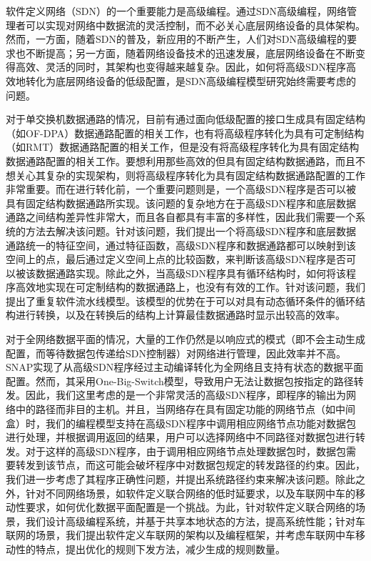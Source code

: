 \begin{cabstract}  

软件定义网络（SDN）的一个重要能力是高级编程。通过SDN高级编程，网络管理者可以实现对网络中数据流的灵活控制，而不必关心底层网络设备的具体架构。然而，一方面，随着SDN的普及，新应用的不断产生，人们对SDN高级编程的要求也不断提高；另一方面，随着网络设备技术的迅速发展，底层网络设备在不断变得高效、灵活的同时，其架构也变得越来越复杂。因此，如何将高级SDN程序高效地转化为底层网络设备的低级配置，是SDN高级编程模型研究始终需要考虑的问题。

对于单交换机数据通路的情况，目前有通过面向低级配置的接口生成具有固定结构（如OF-DPA）数据通路配置的相关工作，也有将高级程序转化为具有可定制结构（如RMT）数据通路配置的相关工作，但是没有将高级程序转化为具有固定结构数据通路配置的相关工作。要想利用那些高效的但具有固定结构数据通路，而且不想关心其复杂的实现架构，则将高级程序转化为具有固定结构数据通路配置的工作非常重要。而在进行转化前，一个重要问题则是，一个高级SDN程序是否可以被具有固定结构数据通路所实现。该问题的复杂地方在于高级SDN程序和底层数据通路之间结构差异性非常大，而且各自都具有丰富的多样性，因此我们需要一个系统的方法去解决该问题。针对该问题，我们提出一个将高级SDN程序和底层数据通路统一的特征空间，通过特征函数，高级SDN程序和数据通路都可以映射到该空间上的点，最后通过定义空间上点的比较函数，来判断该高级SDN程序是否可以被该数据通路实现。除此之外，当高级SDN程序具有循环结构时，如何将该程序高效地实现在可定制结构的数据通路上，也没有有效的工作。针对该问题，我们提出了重复软件流水线模型。该模型的优势在于可以对具有动态循环条件的循环结构进行转换，以及在转换后的结构上计算最佳数据通路时显示出较高的效率。

对于全网络数据平面的情况，大量的工作仍然是以响应式的模式（即不会主动生成配置，而等待数据包传递给SDN控制器）对网络进行管理，因此效率并不高。SNAP实现了从高级SDN程序经过主动编译转化为全网络且支持有状态的数据平面配置。然而，其采用One-Big-Switch模型，导致用户无法让数据包按指定的路径转发。因此，我们这里考虑的是一个非常灵活的高级SDN程序，即程序的输出为网络中的路径而非目的主机。并且，当网络存在具有固定功能的网络节点（如中间盒）时，我们的编程模型支持在高级SDN程序中调用相应网络节点功能对数据包进行处理，并根据调用返回的结果，用户可以选择网络中不同路径对数据包进行转发。对于这样的高级SDN程序，由于调用相应网络节点处理数据包时，数据包需要转发到该节点，而这可能会破坏程序中对数据包规定的转发路径的约束。因此，我们进一步考虑了其程序正确性问题，并提出系统路径约束来解决该问题。除此之外，针对不同网络场景，如软件定义联合网络的低时延要求，以及车联网中车的移动性要求，如何优化数据平面配置是一个挑战。为此，针对软件定义联合网络的场景，我们设计高级编程系统，并基于共享本地状态的方法，提高系统性能；针对车联网的场景，我们提出软件定义车联网的架构以及编程框架，并考虑车联网中车移动性的特点，提出优化的规则下发方法，减少生成的规则数量。

\end{cabstract}

